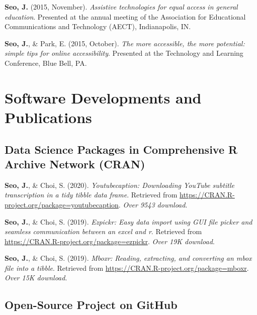 \documentclass[11pt,a4paper,]{awesome-cv}
\begin{document}
\textbf{Seo, J.} (2015, November). \emph{Assistive technologies for
  equal access in general education}. Presented at the annual meeting of
the Association for Educational Communications and Technology (AECT),
Indianapolis, IN.

\textbf{Seo, J.}, \& Park, E. (2015, October). \emph{The more
  accessible, the more potential: simple tips for online accessibility}.
Presented at the Technology and Learning Conference, Blue Bell, PA.

\hypertarget{software-developments-and-publications}{%
  \section{Software Developments and
    Publications}\label{software-developments-and-publications}}

\hypertarget{data-science-packages-in-comprehensive-r-archive-network-cran}{%
  \subsection{Data Science Packages in Comprehensive R Archive Network
    (CRAN)}\label{data-science-packages-in-comprehensive-r-archive-network-cran}}

\hypertarget{refs_R_packages}{}
\leavevmode{}%
\textbf{Seo, J.}, \& Choi, S. (2020). \emph{Youtubecaption: Downloading
  YouTube subtitle transcription in a tidy tibble data frame}. Retrieved
from \url{https://CRAN.R-project.org/package=youtubecaption}. \emph{Over
  9543 download}.

\leavevmode{}%
\textbf{Seo, J.}, \& Choi, S. (2019). \emph{Ezpickr: Easy data import
  using GUI file picker and seamless communication between an excel and
  r}. Retrieved from \url{https://CRAN.R-project.org/package=ezpickr}.
\emph{Over 19K download}.

\leavevmode{}%
\textbf{Seo, J.}, \& Choi, S. (2019). \emph{Mboxr: Reading, extracting,
  and converting an mbox file into a tibble}. Retrieved from
\url{https://CRAN.R-project.org/package=mboxr}. \emph{Over 15K
  download}.

\newpage

\hypertarget{open-source-project-on-github}{%
  \subsection{Open-Source Project on
    GitHub}\label{open-source-project-on-github}}
\end{document}
